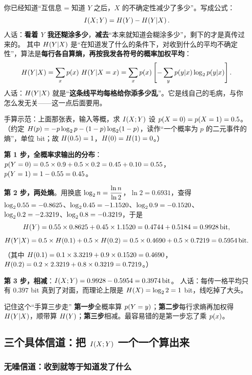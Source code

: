 你已经知道“互信息 = 知道 $Y$ 之后，$X$ 的不确定性减少了多少”。写成公式：
\[
I\!\left(X;Y\right)=H\!\left(Y\right)-H\!\left(Y|X\right).
\]
人话：\textbf{看着 $Y$ 我还糊涂多少}，\textbf{减去}“本来就知道会糊涂多少”，剩下的才是真传过来的。
其中 $H\!\left(Y|X\right)$ 是“在知道发了什么的条件下，对收到什么的平均不确定性”，算法是\textbf{每行各自算熵，再按我发各符号的概率加权平均}：
\[
H\!\left(Y|X\right)=\sum_{x}p\!\left(x\right)\,H\!\left(Y|X=x\right)
=\sum_{x}p\!\left(x\right)\left[-\sum_{y}p\!\left(y|x\right)\log_{2}p\!\left(y|x\right)\right].
\]
人话：$H\!\left(Y|X\right)$ 就是“\textbf{这条线平均每格给你添多少乱}”。它是线自己的毛病，与你怎么发无关——这一点后面要用。

\begin{calc}{手算示范：上面那张表，输入等概，求 $I\!\left(X;Y\right)$}
设 $p\!\left(X=0\right)=p\!\left(X=1\right)=0.5$。（约定 $H\!\left(p\right)=-p\log_{2} p-(1-p)\log_{2}(1-p)$，读作“一个概率为 $p$ 的二元事件的熵”，单位 bit；故 $H\!\left(0.5\right)=1$，$H\!\left(0\right)=H\!\left(1\right)=0$。）

\textbf{第 1 步，全概率求输出的分布}：$p\!\left(Y=0\right)=0.5\times0.9+0.5\times0.2=0.45+0.10=0.55$，$p\!\left(Y=1\right)=1-0.55=0.45$。

\textbf{第 2 步，两处熵}。用换底 $\log_{2} n=\dfrac{\ln n}{\ln2}$，$\ln2=0.6931$，查得 $\log_{2}0.55=-0.8625$、$\log_{2}0.45=-1.1520$、$\log_{2}0.9=-0.1520$、$\log_{2}0.2=-2.3219$、$\log_{2}0.8=-0.3219$，于是
\[
H\!\left(Y\right)=0.55\times0.8625+0.45\times1.1520=0.4744+0.5184=0.9928\,\text{bit},
\]
\[
H\!\left(Y|X\right)=0.5\times H\!\left(0.1\right)+0.5\times H\!\left(0.2\right)=0.5\times0.4690+0.5\times0.7219=0.5954\,\text{bit} .
\]
（其中 $H\!\left(0.1\right)=0.1\times3.3219+0.9\times0.1520=0.4690$，$H\!\left(0.2\right)=0.2\times2.3219+0.8\times0.3219=0.7219$。）

\textbf{第 3 步，相减}：$I\!\left(X;Y\right)=0.9928-0.5954=0.3974\,\text{bit}$。
人话：每传一格平均只有 $0.397$ bit 真到了对面，而理论上限是 $H\!\left(X\right)=\log_{2}2=1$ bit，线吃掉了大头。
\end{calc}

\begin{idea}{记住这个“手算三步走”}
\textbf{第一步}全概率算 $p\!\left(Y=y\right)$；\textbf{第二步}每行求熵再加权得 $H\!\left(Y|X\right)$，顺带算 $H\!\left(Y\right)$；\textbf{第三步}相减。最容易错的是第一步忘了乘 $p\!\left(x\right)$。
\end{idea}

\subsection{三个具体信道：把 $I\!\left(X;Y\right)$ 一个一个算出来}

\subsubsection{无噪信道：收到就等于知道发了什么}

